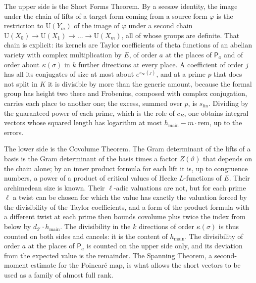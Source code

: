 \documentclass[10pt]{amsart}
\theoremstyle{definition}
\theoremstyle{remark}
\newcommand{\U}{\mathrm U}
\newcommand{\dT}{d_{\mathcal T}}
\newcommand{\hmain}{h_{\mathrm{main}}}
\newcommand{\rem}{\mathrm{rem}}
\newcommand{\Pa}{\mathsf P_a}
\begin{document}
The upper side is the Short Forms Theorem. By a seesaw identity, the image under the chain of
lifts of a target form coming from a source form $\varphi$ is the restriction to $\U(Y_m)$ of
the image of $\varphi$ under a second chain $\U(X_0)\to\U(X_1)\to\dots\to\U(X_m)$, all of whose
groups are definite. That chain is explicit: its kernels are Taylor coefficients of theta
functions of an abelian variety with complex multiplication by $E$, of order $a$ at the places
of $\Pa$ and of order about $\kappa(\sigma)$ in $k$ further directions at every place. A
coefficient of order $j$ has all its conjugates of size at most about $e^{s_\infty(j)}$, and at
a prime $p$ that does not split in $K$ it is divisible by more than the generic amount, because
the formal group has height two there and Frobenius, composed with complex conjugation, carries
each place to another one; the excess, summed over $p$, is $s_{\mathrm{fin}}$. Dividing by the guaranteed power of each prime, which is the
role of $c_B$, one obtains integral vectors whose squared length has logarithm at most
$\hmain-m\cdot\rem$, up to the errors.

The lower side is the Covolume Theorem. The Gram determinant of the lifts of a basis is the Gram
determinant of the basis times a factor $Z(\vartheta)$ that depends on the chain alone; by an
inner product formula for each lift it is, up to congruence numbers, a power of a product of
critical values of Hecke $L$-functions of $E$. Their archimedean size is known. Their
$\ell$-adic valuations are not, but for each prime $\ell$ a twist can be chosen for which the
value has exactly the valuation forced by the divisibility of the Taylor coefficients, and a
form of the product formula with a different twist at each prime then bounds covolume plus
twice the index from below by $\dT\cdot\hmain$. The divisibility in the $k$ directions of order
$\kappa(\sigma)$ is thus counted on both sides and cancels: it is the content of $\hmain$. The
divisibility of order $a$ at the places of $\Pa$ is counted on the upper side only, and its
deviation from the expected value is the remainder. The Spanning Theorem, a second-moment
estimate for the Poincar\'e map, is what allows the short vectors to be used as a family of
almost full rank.
\end{document}
